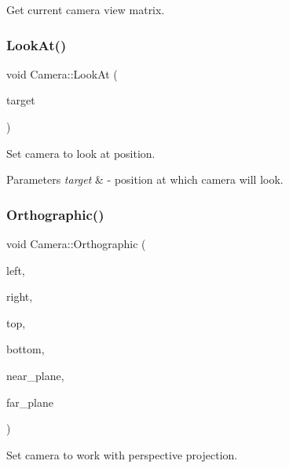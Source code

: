 Get current camera view matrix. 

\mbox{\label{class_camera_a657181de0da2b330865d005a3e08cc9f}} 
\subsubsection{\texorpdfstring{LookAt()}{LookAt()}}
{\footnotesize\ttfamily void Camera\+::\+Look\+At (\begin{DoxyParamCaption}\item[{glm\+::vec3}]{target }\end{DoxyParamCaption})}



Set camera to look at position. 


\begin{DoxyParams}{Parameters}
{\em target} & -\/ position at which camera will look. \\
\hline
\end{DoxyParams}
\mbox{\label{class_camera_ad434a557e137d9c24369a3737f857736}} 
\subsubsection{\texorpdfstring{Orthographic()}{Orthographic()}}
{\footnotesize\ttfamily void Camera\+::\+Orthographic (\begin{DoxyParamCaption}\item[{G\+Lfloat}]{left,  }\item[{G\+Lfloat}]{right,  }\item[{G\+Lfloat}]{top,  }\item[{G\+Lfloat}]{bottom,  }\item[{G\+Lfloat}]{near\+\_\+plane,  }\item[{G\+Lfloat}]{far\+\_\+plane }\end{DoxyParamCaption})}



Set camera to work with perspective projection. 


